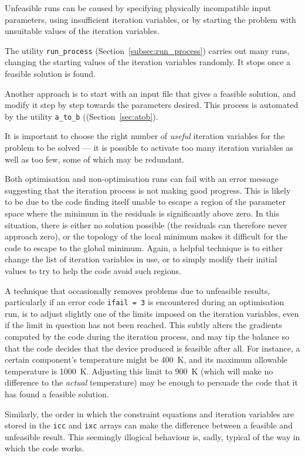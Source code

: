 Unfeasible runs can be caused by specifying physically incompatible input parameters,  using insufficient iteration variables, or by starting the problem with unsuitable values of the iteration variables.

The utility \texttt{run\_process} (Section~\ref{subsec:run_process}) carries out many runs, changing the starting values of the iteration variables randomly.  It stops once a feasible solution is found.

Another approach is to start with an input file that gives a feasible solution, and modify it step by step towards the parameters desired.  This process is automated by the
utility \texttt{a\_to\_b} ((Section~\ref{sec:atob}).

It is important to choose the right number of \textit{useful}\/ iteration variables for the
problem to be solved --- it is possible to activate too many iteration variables as well as too few, some of which may be redundant.

Both optimisation and non-optimisation runs can fail with an error message
suggesting that the iteration process is not making good progress. This is
likely to be due to the code finding itself unable to escape a region of the
parameter space where the minimum in the residuals is significantly above
zero. In this situation, there is either no solution possible (the residuals
can therefore never approach zero), or the topology of the local minimum makes
it difficult for the code to escape to the global minimum. Again, a helpful
technique is to either change the list of iteration variables in use, or to
simply modify their initial values to try to help the code avoid such regions.

A technique that occasionally removes problems due to unfeasible results,
particularly if an error code \texttt{ifail = 3} is encountered during an
optimisation run, is to adjust slightly one of the limits imposed on the
iteration variables, even if the limit in question has not been reached. This
subtly alters the gradients computed by the code during the iteration process,
and may tip the balance so that the code decides that the device produced is
feasible after all. For instance, a certain component's temperature might be
400~K, and its maximum allowable temperature is 1000~K\@. Adjusting this limit
to 900~K (which will make no difference to the \textit{actual}\/ temperature)
may be enough to persuade the code that it has found a feasible solution.

Similarly, the order in which the constraint equations and iteration variables
are stored in the \texttt{icc} and \texttt{ixc} arrays can make the difference
between a feasible and unfeasible result. This seemingly illogical behaviour
is, sadly, typical of the way in which the code works.

